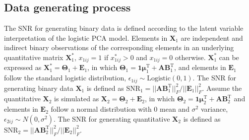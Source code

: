 \subsection{Data generating process}
The SNR for generating binary data is defined according to the latent variable interpretation of the logistic PCA model. Elements in $\mathbf{X}_1$ are independent and indirect binary observations of the corresponding elements in an underlying quantitative matrix $\mathbf{X}_1^{\ast}$, $x_{1ij} = 1$ if $x_{1ij}^{\ast}>0$ and $x_{1ij} = 0$ otherwise. $\mathbf{X}_1^{\ast}$ can be expressed as $\mathbf{X}_1^{\ast} = \mathbf{\Theta}_1 + \mathbf{E}_1$, in which $\mathbf{\Theta}_1 = \mathbf{1}\bm{\mu}_1^{\text{T}} + \mathbf{AB}_1^{\text{T}}$, and elements in $\mathbf{E}_1$ follow the standard logistic distribution, $\epsilon_{1ij} \sim \text{Logistic}(0,1)$. The SNR for generating binary data $\mathbf{X}_1$ is defined as $\text{SNR}_1 = ||\mathbf{AB}_1^{\text{T}}||_{F}^2/||\mathbf{E}_1||_{F}^2$. Assume the quantitative $\mathbf{X}_2$ is simulated as $\mathbf{X}_2 = \mathbf{\Theta}_2 + \mathbf{E}_2$, in which $\mathbf{\Theta}_2 = \mathbf{1}\bm{\mu}_2^{\text{T}} + \mathbf{AB}_2^{\text{T}}$ and elements in $\mathbf{E}_2$ follow a normal distribution with 0 mean and $\sigma^2$ variance, $\epsilon_{2ij} \sim N(0,\sigma^2)$. The SNR for generating quantitative $\mathbf{X}_2$ is defined as $\text{SNR}_2 = ||\mathbf{AB}_2^{\text{T}}||_{F}^2/||\mathbf{E}_2||_{F}^2$.

